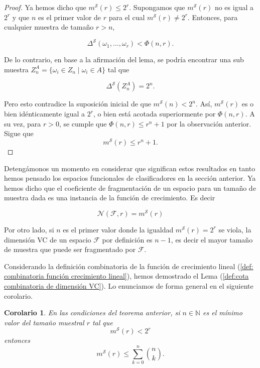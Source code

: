 \documentclass{report}
\newtheorem{cor}{Corolario}[thm]
\begin{document}
\begin{proof}
Ya hemos dicho que \( m^{\mathcal{S}}(r) \leq 2^r \). Supongamos que \( m^{\mathcal{S}}(r) \) no es
 igual a \( 2^r \) y que \( n \) es el primer valor de \( r \) para el cual \( m^{\mathcal{S}}(r) \neq 2^r \).
    Entonces, para cualquier muestra de tamaño \( r > n \),

    \[
    \Delta^{\mathcal{S}}(\omega_1, \dots, \omega_r) < \Phi(n, r).
    \]

    De lo contrario, en base a la afirmación del lema, se podría encontrar una sub muestra
    \( Z_n^A = \{\omega_i \in Z_n \mid \omega_i \in A\} \) tal que

    \[
    \Delta^{\mathcal{S}}\left(Z_n^A\right) = 2^n.
    \]

  Pero esto contradice la suposición inicial de que \( m^{\mathcal{S}}(n) < 2^n \).
    Así, \( m^{\mathcal{S}}(r) \) es o bien idénticamente igual a \( 2^r \), o bien está acotada superiormente
    por \( \Phi(n, r) \). A su vez, para \( r > 0 \), se cumple que \( \Phi(n, r) \leq r^n + 1 \) por la observación
    anterior. Sigue que
    \[
        m^{\mathcal{S}}(r)   \leq r^n + 1.
    \]

\end{proof}


Detengámonos un momento en considerar que significan estos resultados en tanto hemos pensado los espacios funcionales
de clasificadores en la sección anterior. Ya hemos dicho que el coeficiente de fragmentación de un espacio para un tamaño
de muestra dada es una instancia de la función de crecimiento. Es decir

\[
\mathcal{N}(\mathcal{F}, r) = m^{\mathcal{S}}(r)
\]

Por otro lado, si $n$ es el primer valor donde la igualdad $m^{\mathcal{S}}(r)=2^r$ se viola, la dimensión VC de un espacio $\mathcal{F}$
por definición es $n-1$, es decir el mayor tamaño de muestra que puede ser fragmentado por $\mathcal{F}$.

Considerando la definición combinatoria de la función de crecimiento lineal (\ref{def: combinatoria función crecimiento lineal}),
hemos demostrado el Lema (\ref{def:cota combinatoria de dimensión VC}). Lo enunciamos de forma general en el siguiente corolario.

\begin{cor}
    En las condiciones del teorema anterior, si $n\in\mathbb{N}$ es el mínimo valor del tamaño muestral $r$ tal que
    \[
        m^{\mathcal{S}}(r) < 2^r
    \]
    entonces
    \[
        m^{\mathcal{S}}(r) \leq \sum\limits_{k=0}^{n} \binom{n}{k}.
    \]
\end{cor}
\end{document}
